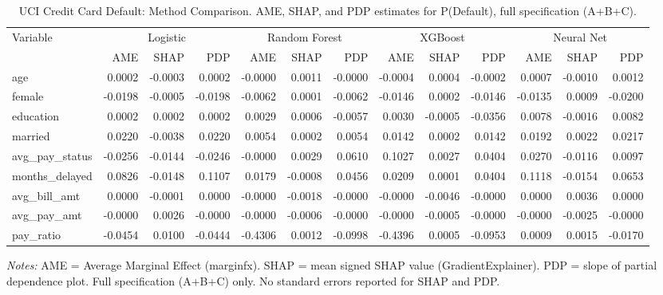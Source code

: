 \documentclass[12pt]{article}
\begin{document}
		\begin{table}
		\centering
		\small
		\begin{threeparttable}
			\caption{UCI Credit Card Default: Method Comparison. AME, SHAP, and PDP estimates for P(Default), full specification (A+B+C).}
			\label{tab:credit_default_method_comparison}
			\begin{tabular}{lrrrrrrrrrrrr}
				\toprule
				Variable & \multicolumn{3}{c}{Logistic} & \multicolumn{3}{c}{Random Forest} & \multicolumn{3}{c}{XGBoost} & \multicolumn{3}{c}{Neural Net} \\
				\cmidrule(lr){2-4} \cmidrule(lr){5-7} \cmidrule(lr){8-10} \cmidrule(lr){11-13} 
				& AME & SHAP & PDP & AME & SHAP & PDP & AME & SHAP & PDP & AME & SHAP & PDP \\
				\midrule
				age & 0.0002 & -0.0003 & 0.0002 & -0.0000 & 0.0011 & -0.0000 & -0.0004 & 0.0004 & -0.0002 & 0.0007 & -0.0010 & 0.0012 \\
				female & -0.0198 & -0.0005 & -0.0198 & -0.0062 & 0.0001 & -0.0062 & -0.0146 & 0.0002 & -0.0146 & -0.0135 & 0.0009 & -0.0200 \\
				education & 0.0002 & 0.0002 & 0.0002 & 0.0029 & 0.0006 & -0.0057 & 0.0030 & -0.0005 & -0.0356 & 0.0078 & -0.0016 & 0.0082 \\
				married & 0.0220 & -0.0038 & 0.0220 & 0.0054 & 0.0002 & 0.0054 & 0.0142 & 0.0002 & 0.0142 & 0.0192 & 0.0022 & 0.0217 \\
				\midrule
				avg\_pay\_status & -0.0256 & -0.0144 & -0.0246 & -0.0000 & 0.0029 & 0.0610 & 0.1027 & 0.0027 & 0.0404 & 0.0270 & -0.0116 & 0.0097 \\
				months\_delayed & 0.0826 & -0.0148 & 0.1107 & 0.0179 & -0.0008 & 0.0456 & 0.0209 & 0.0001 & 0.0404 & 0.1118 & -0.0154 & 0.0653 \\
				\midrule
				avg\_bill\_amt & 0.0000 & -0.0001 & 0.0000 & -0.0000 & -0.0018 & -0.0000 & -0.0000 & -0.0046 & -0.0000 & 0.0000 & 0.0036 & 0.0000 \\
				avg\_pay\_amt & -0.0000 & 0.0026 & -0.0000 & -0.0000 & -0.0006 & -0.0000 & -0.0000 & -0.0005 & -0.0000 & -0.0000 & -0.0025 & -0.0000 \\
				pay\_ratio & -0.0454 & 0.0100 & -0.0444 & -0.4306 & 0.0012 & -0.0998 & -0.4396 & 0.0005 & -0.0953 & 0.0009 & 0.0015 & -0.0170 \\
				\bottomrule
			\end{tabular}
			\begin{tablenotes}
				\footnotesize
				\item \textit{Notes:} AME = Average Marginal Effect (marginfx). SHAP = mean signed SHAP value (GradientExplainer). PDP = slope of partial dependence plot. Full specification (A+B+C) only. No standard errors reported for SHAP and PDP.
			\end{tablenotes}
		\end{threeparttable}
	\end{table}
	
\end{document}
